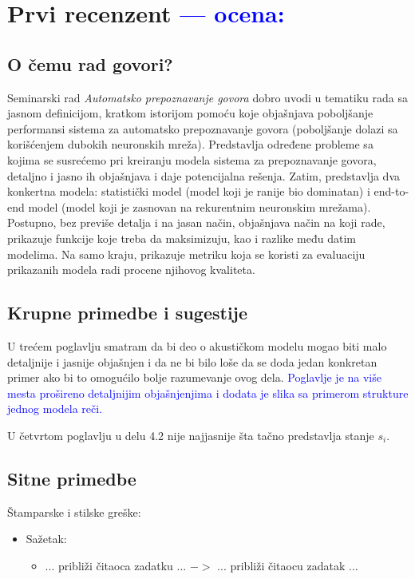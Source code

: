 \documentclass[a4paper]{report}
\newcommand{\odgovor}[1]{\textcolor{blue}{#1}}
\begin{document}
\chapter{Prvi recenzent \odgovor{--- ocena:} }
\section{O čemu rad govori?}
Seminarski rad \emph{Automatsko prepoznavanje govora} dobro uvodi u tematiku rada sa jasnom definicijom, kratkom istorijom pomoću koje objašnjava poboljšanje performansi sistema za automatsko prepoznavanje govora (poboljšanje dolazi sa korišćenjem dubokih neuronskih mreža). Predstavlja određene probleme sa kojima se susrećemo pri kreiranju modela sistema za prepoznavanje govora, detaljno i jasno ih objašnjava i daje potencijalna rešenja. Zatim, predstavlja dva konkertna modela: statistički model (model koji je ranije bio dominatan) i end-to-end model (model koji je zasnovan na rekurentnim neuronskim mrežama). Postupno, bez previše detalja i na jasan način, objašnjava način na koji rade, prikazuje funkcije koje treba da maksimizuju, kao i razlike među datim modelima. Na samo kraju, prikazuje metriku koja se koristi za evaluaciju prikazanih modela radi procene njihovog kvaliteta.

\section{Krupne primedbe i sugestije}
U trećem poglavlju smatram da bi deo o akustičkom modelu mogao biti malo detaljnije i jasnije objašnjen i da ne bi bilo loše da se doda jedan konkretan primer ako bi to omogućilo bolje razumevanje ovog dela.
\odgovor{Poglavlje je na više mesta prošireno detaljnijim objašnjenjima i dodata je slika sa primerom strukture jednog modela reči.}

U četvrtom poglavlju u delu 4.2 nije najjasnije šta tačno predstavlja stanje $s_i$.

\section{Sitne primedbe}
Štamparske i stilske greške:
\begin{itemize}
  \item Sažetak:
  \begin{itemize}
  \item ... približi čitaoca zadatku ... $->$ ... približi čitaocu zadatak ...
 \end{itemize}
\end{itemize}
\end{document}
